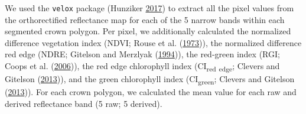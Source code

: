 \documentclass[twoside,12pt,final]{ucthesis-CA2012}
\begin{document}
\begin{ucmainmatter}
We used the \texttt{velox} package (Hunziker
\protect\hyperlink{ref-hunziker2017}{2017}) to extract all the pixel
values from the orthorectified reflectance map for each of the 5 narrow
bands within each segmented crown polygon. Per pixel, we additionally
calculated the normalized difference vegetation index (NDVI; Rouse et
al. (\protect\hyperlink{ref-rouse1973}{1973})), the normalized
difference red edge (NDRE; Gitelson and Merzlyak
(\protect\hyperlink{ref-gitelson1994}{1994})), the red-green index (RGI;
Coops et al. (\protect\hyperlink{ref-coops2006}{2006})), the red edge
chlorophyll index (CI\textsubscript{red} \textsubscript{edge}; Clevers
and Gitelson (\protect\hyperlink{ref-clevers2013}{2013})), and the green
chlorophyll index (CI\textsubscript{green}; Clevers and Gitelson
(\protect\hyperlink{ref-clevers2013}{2013})). For each crown polygon, we
calculated the mean value for each raw and derived reflectance band (5
raw; 5 derived).


\end{ucmainmatter}
\end{document}
